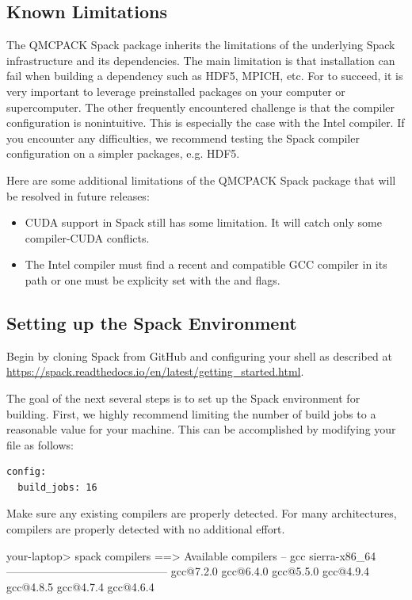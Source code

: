 \subsection{Known Limitations}
The QMCPACK Spack package inherits the limitations of the underlying
Spack infrastructure and its dependencies. The main limitation is that
installation can fail when building a dependency such as HDF5, MPICH,
etc. For  to succeed, it is very
important to leverage preinstalled packages on your computer or
supercomputer. The other frequently encountered challenge is that the
compiler configuration is nonintuitive.  This is especially the case
with the Intel compiler. If you encounter any difficulties, we
recommend testing the Spack compiler configuration on a simpler
packages, e.g. HDF5.

Here are some additional limitations of the QMCPACK Spack package that
will be resolved in future releases:
\begin{itemize}
\item CUDA support in Spack still has some limitation.  It will
  catch only some compiler-CUDA conflicts.
\item The Intel compiler must find a recent and compatible GCC
  compiler in its path or one must be explicity set with the
   and  flags.
\end{itemize}

\subsection{Setting up the Spack Environment}
Begin by cloning Spack from GitHub and configuring your shell as described at 
\url{https://spack.readthedocs.io/en/latest/getting_started.html}.

The goal of the next several steps is to set up the Spack environment
for building. First, we highly recommend limiting the number of build jobs to
a reasonable value for your machine. This can be
accomplished by modifying your  file as follows:

\begin{lstlisting}[style=SHELL]
config:
  build_jobs: 16
\end{lstlisting}

Make sure any existing compilers are properly detected. For many
architectures, compilers are properly detected with no additional
effort.

\begin{shade}
your-laptop> spack compilers
==> Available compilers
-- gcc sierra-x86_64 --------------------------------------------
gcc@7.2.0  gcc@6.4.0  gcc@5.5.0  gcc@4.9.4  gcc@4.8.5  gcc@4.7.4  gcc@4.6.4
\end{shade}

